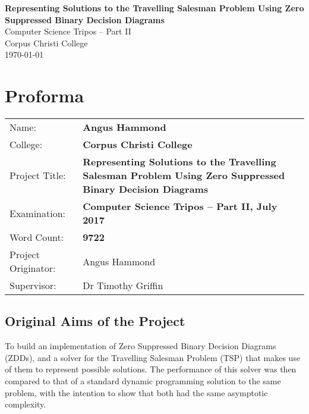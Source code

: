 \documentclass[12pt,a4paper,twoside,openright]{report}
\begin{document}





\pagestyle{empty}


\vspace*{60mm}
\begin{center}
\Huge
\textbf{Representing Solutions to the Travelling Salesman Problem Using Zero Suppressed Binary Decision Diagrams} \\[5mm]
Computer Science Tripos -- Part II \\[5mm]
Corpus Christi College \\[5mm]
\today  %
\end{center}


\pagestyle{plain}

\chapter*{Proforma}

{\large
\begin{tabular}{lp{12cm}}
Name:               & \bf Angus Hammond                       \\
College:            & \bf Corpus Christi College                     \\
Project Title:      & \bf Representing Solutions to the Travelling Salesman Problem Using Zero Suppressed Binary Decision Diagrams \\
Examination:        & \bf Computer Science Tripos -- Part II, July 2017  \\
Word Count:         & \bf 9722  \\
Project Originator: & Angus Hammond                    \\
Supervisor:         & Dr Timothy Griffin                    \\ 
\end{tabular}
}


\section*{Original Aims of the Project}

To build an implementation of Zero Suppressed Binary Decision Diagrams (ZDDs), and a solver for the Travelling Salesman Problem (TSP) that makes use of them to represent possible solutions. The performance of this solver was then compared to that of a standard dynamic programming solution to the same problem, with the intention to show that both had the same asymptotic complexity. 
\end{document}
